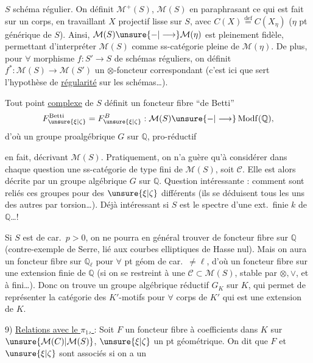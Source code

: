 $S$ schéma régulier. 
On définit $\mathcal{M}^+(S)$, $\mathcal{M}(S)$ en paraphrasant ce qui est fait sur un corps, en travaillant  $X$ projectif lisse sur $S$, avec $C(X)\overset{\mathrm{def}}=C(X_\eta)$ ($\eta$ pt générique de $S$).
Ainsi, $\mathcal{M}(S)\unsure{-|\longrightarrow}\mathcal{M}(\eta)$ est pleinement fidèle, permettant d'interpréter $\mathcal{M}(S)$ comme ss-catégorie pleine de $\mathcal{M}(\eta)$.
De plus, pour $\forall$ morphisme $f:S'\longrightarrow S$ de schémas réguliers, on définit $f^*:\mathcal{M}(S)\longrightarrow \mathcal{M}(S')$ un $\otimes$-foncteur correspondant (c'est ici que sert l'hypothèse de \uline{régularité} sur les schémas\dots).

Tout point  \uline{complexe} de $S$ définit un foncteur fibre ``de Betti'' 
\[
F_{\unsure{\xi|\zeta}}^{\mathrm{Betti}}=F_{\unsure{\xi|\zeta}}^B:
\mathcal{M}(S)\unsure{-|\longrightarrow}\operatorname{Modf}(\mathbb{Q}),
\]
d'où un groupe proalgébrique $G$ sur $\mathbb{Q}$, pro-réductif

en fait,  décrivant $\mathcal{M}(S)$.
Pratiquement, on n'a guère qu'à considérer dans  chaque question une ss-catégorie de type fini de $\mathcal{M}(S)$, soit $\mathcal C$. Elle est alors décrite par un  groupe algébrique  $G$ sur $\mathbb{Q}$.
Question intéressante : comment sont reliés ces groupes pour des $\unsure{\xi|\zeta}$ différents (ils se déduisent tous les uns des autres par torsion\dots).
Déjà intéressant si $S$ est le spectre d'une ext.\ finie $k$ de $\mathbb{Q}$\dots!

Si $S$ est de car.\ $p>0$, on ne pourra en général trouver de foncteur fibre sur $\mathbb{Q}$ (contre-exemple de Serre, lié aux courbes elliptiques de Hasse nul).
Mais on aura un foncteur fibre sur $\mathbb{Q}_\ell$ pour $\forall$ pt géom de car.\ $\ne\ell$, d'où un foncteur fibre sur une extension finie  de $\mathbb{Q}$ (si on se restreint à une $\mathcal C\subset \mathcal{M}(S)$, stable par  $\otimes,\vee$, et à  fini\dots).
Donc on trouve un groupe algébrique réductif $G_K$ sur $K$, qui permet de représenter la catégorie des $K'$-motifs pour $\forall$ corps de  $K'$ qui est une extension de $K$.

9) \uline{Relations avec le $\pi_1$, } :
Soit $F$ un foncteur fibre à coefficients dans $K$ sur $\unsure{\mathcal{M}(C)|\mathcal{M}(S)}$,
$\unsure{\xi|\zeta}$ un pt géométrique. On dit que $F$ et $\unsure{\xi|\zeta}$ sont associés si on a un 

